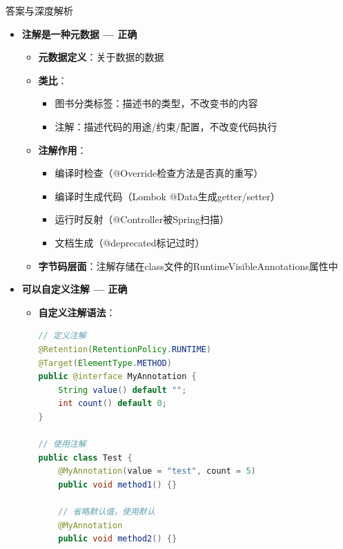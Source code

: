 \documentclass[12pt, a4paper]{ctexart}
\begin{document}
\begin{enumerate}[label=\textbf{\arabic*.}]
\begin{bluebox}{答案与深度解析}
		      \begin{itemize}[leftmargin=*, nosep, label={}]
			      \item[A] \textbf{注解是一种元数据 — 正确}
			            \begin{itemize}[label={}, leftmargin=*, nosep]
				            \item \textbf{元数据定义}：关于数据的数据
				            \item \textbf{类比}：
				                  \begin{itemize}[label={}, nosep]
					                  \item 图书分类标签：描述书的类型，不改变书的内容
					                  \item 注解：描述代码的用途/约束/配置，不改变代码执行
				                  \end{itemize}
				            \item \textbf{注解作用}：
				                  \begin{itemize}[label={}, nosep]
					                  \item 编译时检查（@Override检查方法是否真的重写）
					                  \item 编译时生成代码（Lombok @Data生成getter/setter）
					                  \item 运行时反射（@Controller被Spring扫描）
					                  \item 文档生成（@deprecated标记过时）
				                  \end{itemize}
				            \item \textbf{字节码层面}：注解存储在class文件的RuntimeVisibleAnnotations属性中
			            \end{itemize}

			      \item[B] \textbf{可以自定义注解 — 正确}
			            \begin{itemize}[label={}, leftmargin=*, nosep]
				            \item \textbf{自定义注解语法}：
				                  \begin{lstlisting}[language=Java]
// 定义注解
@Retention(RetentionPolicy.RUNTIME)
@Target(ElementType.METHOD)
public @interface MyAnnotation {
    String value() default "";
    int count() default 0;
}

// 使用注解
public class Test {
    @MyAnnotation(value = "test", count = 5)
    public void method1() {}

    // 省略默认值，使用默认
    @MyAnnotation
    public void method2() {}


\end{lstlisting}
\end{itemize}
\end{itemize}
\end{bluebox}
\end{enumerate}
\end{document}
